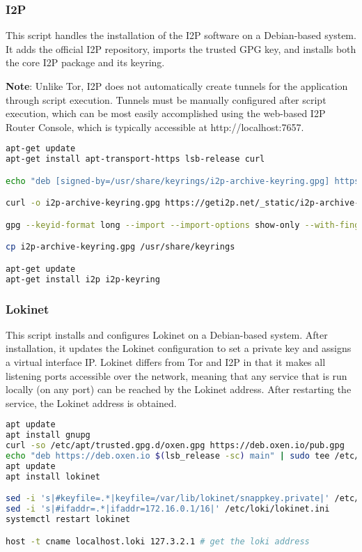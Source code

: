 \subsubsection{I2P}
This script handles the installation of the I2P software on a Debian-based system. It adds the official I2P repository, imports the trusted GPG key, and installs both the core I2P package and its keyring.

\textbf{Note}: Unlike Tor, I2P does not automatically create tunnels for the application through script execution. Tunnels must be manually configured after script execution, which can be most easily accomplished using the web-based I2P Router Console, which is typically accessible at http://localhost:7657.

\footnotesize
\begin{lstlisting}[language=bash, breaklines=true, breakatwhitespace=true, showstringspaces=false]
apt-get update
apt-get install apt-transport-https lsb-release curl

echo "deb [signed-by=/usr/share/keyrings/i2p-archive-keyring.gpg] https://deb.i2p.net/ $(lsb_release -sc) main" > /etc/apt/sources.list.d/i2p.list

curl -o i2p-archive-keyring.gpg https://geti2p.net/_static/i2p-archive-keyring.gpg

gpg --keyid-format long --import --import-options show-only --with-fingerprint i2p-archive-keyring.gpg

cp i2p-archive-keyring.gpg /usr/share/keyrings

apt-get update
apt-get install i2p i2p-keyring
\end{lstlisting}
\normalsize

\subsubsection{Lokinet}
This script installs and configures Lokinet on a Debian-based system. After installation, it updates the Lokinet configuration to set a private key and assigns a virtual interface IP. Lokinet differs from Tor and I2P in that it makes all listening ports accessible over the network, meaning that any service that is run locally (on any port) can be reached by the Lokinet address. After restarting the service, the Lokinet address is obtained.

\footnotesize
\begin{lstlisting}[language=bash, breaklines=true, breakatwhitespace=true, showstringspaces=false]
apt update
apt install gnupg
curl -so /etc/apt/trusted.gpg.d/oxen.gpg https://deb.oxen.io/pub.gpg
echo "deb https://deb.oxen.io $(lsb_release -sc) main" | sudo tee /etc/apt/sources.list.d/oxen.list
apt update
apt install lokinet

sed -i 's|#keyfile=.*|keyfile=/var/lib/lokinet/snappkey.private|' /etc/loki/lokinet.ini
sed -i 's|#ifaddr=.*|ifaddr=172.16.0.1/16|' /etc/loki/lokinet.ini
systemctl restart lokinet

host -t cname localhost.loki 127.3.2.1 # get the loki address
\end{lstlisting}
